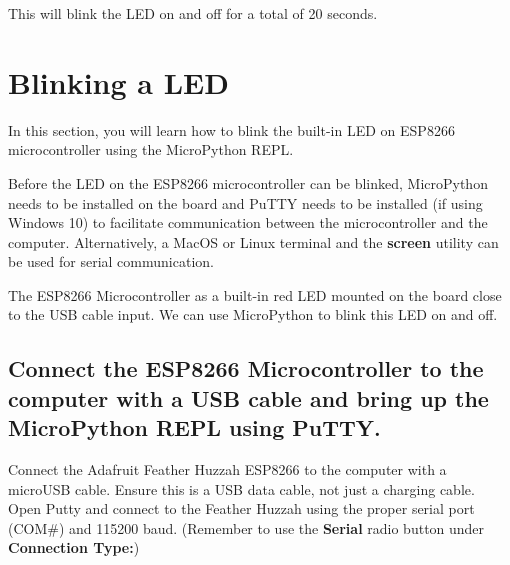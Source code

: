 \documentclass{book}
\begin{document}
This will blink the LED on and off for a total of 20 seconds.
    




    
        \section{Blinking a LED}\label{blinking-a-led}
    




    
        In this section, you will learn how to blink the built-in LED on ESP8266
microcontroller using the MicroPython REPL.

Before the LED on the ESP8266 microcontroller can be blinked,
MicroPython needs to be installed on the board and PuTTY needs to be
installed (if using Windows 10) to facilitate communication between the
microcontroller and the computer. Alternatively, a MacOS or Linux
terminal and the \textbf{screen} utility can be used for serial
communication.
    




    
        The ESP8266 Microcontroller as a built-in red LED mounted on the board
close to the USB cable input. We can use MicroPython to blink this LED
on and off.
    




    
        \subsection{Connect the ESP8266 Microcontroller to the computer with a
USB cable and bring up the MicroPython REPL using
PuTTY.}\label{connect-the-esp8266-microcontroller-to-the-computer-with-a-usb-cable-and-bring-up-the-micropython-repl-using-putty.}
    




    
        Connect the Adafruit Feather Huzzah ESP8266 to the computer with a
microUSB cable. Ensure this is a USB data cable, not just a charging
cable. Open Putty and connect to the Feather Huzzah using the proper
serial port (COM\#) and 115200 baud. (Remember to use the
\textbf{Serial} radio button under \textbf{Connection Type:})
\end{document}
